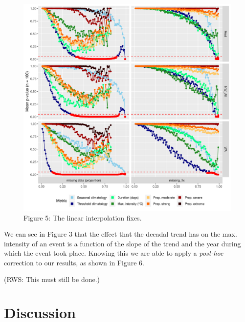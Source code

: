 \documentclass[]{article}
\begin{document}
\begin{figure}
\centering
\includegraphics{../output/fig_2_missing_only.png}
\caption{Figure 5: The linear interpolation fixes.}
\end{figure}

We can see in Figure 3 that the effect that the decadal trend has on the
max. intensity of an event is a function of the slope of the trend and
the year during which the event took place. Knowing this we are able to
apply a \emph{post-hoc} correction to our results, as shown in Figure 6.

(RWS: This must still be done.)

\hypertarget{discussion}{%
\section{Discussion}\label{discussion}}
\end{document}
